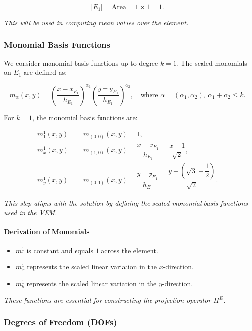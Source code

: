 \documentclass[class=article, crop=false]{standalone}
\begin{document}
\[
|E_1| = \text{Area} = 1 \times 1 = 1.
\]

\noindent
\textit{This will be used in computing mean values over the element.}

\subsubsection{Monomial Basis Functions}

We consider monomial basis functions up to degree $k = 1$. The scaled monomials on $E_1$ are defined as:

\[
m_{\alpha}(x, y) = \left( \dfrac{x - x_{E_1}}{h_{E_1}} \right)^{\alpha_1} \left( \dfrac{y - y_{E_1}}{h_{E_1}} \right)^{\alpha_2}, \quad \text{where } \alpha = (\alpha_1, \alpha_2),\ \alpha_1 + \alpha_2 \leq k.
\]

For $k = 1$, the monomial basis functions are:

\begin{align*}
m_1^1(x, y) &= m_{(0, 0)}(x, y) = 1, \\
m_x^1(x, y) &= m_{(1, 0)}(x, y) = \dfrac{x - x_{E_1}}{h_{E_1}} = \dfrac{x - 1}{\sqrt{2}}, \\
m_y^1(x, y) &= m_{(0, 1)}(x, y) = \dfrac{y - y_{E_1}}{h_{E_1}} = \dfrac{y - \left( \sqrt{3} + \dfrac{1}{2} \right)}{\sqrt{2}}.
\end{align*}

\noindent
\textit{This step aligns with the solution by defining the scaled monomial basis functions used in the VEM.}

\paragraph{Derivation of Monomials}

\begin{itemize}
    \item $m_1^1$ is constant and equals $1$ across the element.
    \item $m_x^1$ represents the scaled linear variation in the $x$-direction.
    \item $m_y^1$ represents the scaled linear variation in the $y$-direction.
\end{itemize}

\noindent
\textit{These functions are essential for constructing the projection operator $\Pi^E$.}

\subsubsection{Degrees of Freedom (DOFs)}
\end{document}
